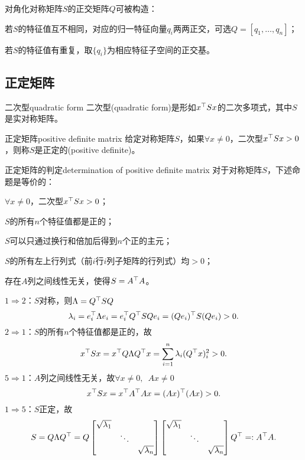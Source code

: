 对角化对称矩阵$S$的正交矩阵$Q$可被构造：
\begin{compactitem}
	\item 若$S$的特征值互不相同，对应的归一特征向量$q_i$两两正交，可选$Q=[q_1,\ldots,q_n]$；
	\item 若$S$的特征值有重复，取$\{q_i\}$为相应特征子空间的正交基。
\end{compactitem}
\subsection{正定矩阵}
\begin{definition}{二次型}{quadratic form}
	二次型(quadratic form)是形如$x^\top Sx$的二次多项式，其中$S$是实对称矩阵。
\end{definition}
\begin{definition}{正定矩阵}{positive definite matrix}
	给定对称矩阵$S$，如果$\forall x\neq 0$，二次型$x^\top Sx>0$，则称$S$是正定的(positive definite)。
\end{definition}
\begin{theorem}{正定矩阵的判定}{determination of positive definite matrix}
	对于对称矩阵$S$，下述命题是等价的：
	\begin{compactenum}
		\item $\forall x\neq 0$，二次型$x^\top Sx>0$；
		\item $S$的所有$n$个特征值都是正的；
		\item $S$可以只通过换行和倍加后得到$n$个正的主元；
		\item $S$的所有左上行列式（前$i$行$i$列子矩阵的行列式）均$>0$；
		\item 存在$A$列之间线性无关，使得$S=A^\top A$。
	\end{compactenum}
\end{theorem}
\prf $1\Rightarrow 2$：$S$对称，则$\Lambda=Q^\top SQ$
\[
	\lambda_i=e_i^\top \Lambda e_i=e_i^\top Q^\top SQe_i=(Qe_i)^\top S(Qe_i)>0.
\]
$2\Rightarrow 1$：$S$的所有$n$个特征值都是正的，故
\[
	x^\top Sx=x^\top Q\Lambda Q^\top x=\sum_{i=1}^n\lambda_i(Q^\top x)^2_i>0.
\]
$5\Rightarrow 1$：$A$列之间线性无关，故$\forall x\neq 0,\enspace Ax\neq 0$
\[
	x^\top Sx=x^\top A^\top Ax=(Ax)^\top(Ax)>0.
\]
$1\Rightarrow 5$：$S$正定，故
\[
	S=Q\Lambda Q^\top=Q\begin{bmatrix}
		\sqrt{\lambda_1}\\ &\ddots\\ &&\sqrt{\lambda_n}
	\end{bmatrix}\begin{bmatrix}
		\sqrt{\lambda_1}\\ &\ddots\\ &&\sqrt{\lambda_n}
	\end{bmatrix}Q^\top=:A^\top A.
\]
